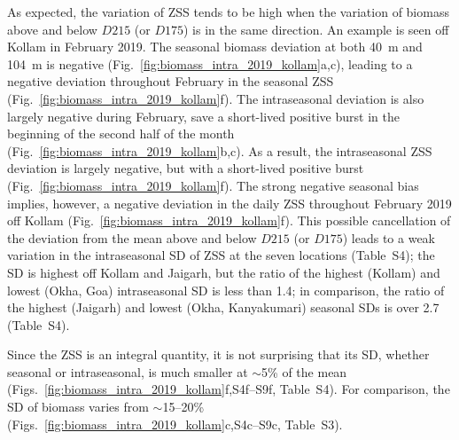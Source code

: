 \documentclass[authoryear,review,11pt]{elsarticle}
\newcommand{\chla}{chl-{\emph{a}}}
\begin{document}
As expected, the variation of ZSS tends to be high when the variation of biomass above and below $D215$ (or $D175$) is in the same direction. An example is seen off Kollam in February 2019.  The seasonal biomass deviation at both 40~m and 104~m is negative (Fig.~\ref{fig:biomass_intra_2019_kollam}a,c), leading to a negative deviation throughout February in the seasonal ZSS (Fig.~\ref{fig:biomass_intra_2019_kollam}f).  The intraseasonal deviation is also largely negative during February, save a short-lived positive burst in the beginning of the second half of the month (Fig.~\ref{fig:biomass_intra_2019_kollam}b,c).  As a result, the intraseasonal ZSS deviation is largely negative, but with a short-lived positive burst (Fig.~\ref{fig:biomass_intra_2019_kollam}f). The strong negative seasonal bias implies, however, a negative deviation in the daily ZSS throughout February 2019 off Kollam (Fig.~\ref{fig:biomass_intra_2019_kollam}f).  This possible cancellation of the deviation from the mean above and below $D215$ (or $D175$) leads to a weak variation in the intraseasonal SD of ZSS at the seven locations (Table~S4); the SD is highest off Kollam and Jaigarh, but the ratio of the highest (Kollam) and lowest (Okha, Goa) intraseasonal SD is less than 1.4; in comparison, the ratio of the highest (Jaigarh) and lowest (Okha, Kanyakumari) seasonal SDs is over 2.7 (Table~S4).

Since the ZSS is an integral quantity, it is not surprising that its SD, whether seasonal or intraseasonal, is much smaller at $\sim$5\% of the mean (Figs.~\ref{fig:biomass_intra_2019_kollam}f,S4f--S9f, Table~S4). For comparison, the SD of biomass varies from $\sim$15--20\% (Figs.~\ref{fig:biomass_intra_2019_kollam}c,S4c--S9c, Table~S3).





\end{document}
